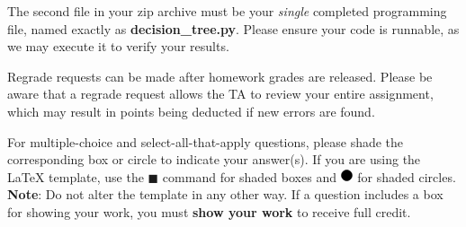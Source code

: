 \documentclass{article}
\newcommand{\blackcircle}{\tikz\draw[black,fill=black] (0,0) circle (1ex);}
\begin{document}
\begin{itemize}
\begin{itemize}
The second file in your zip archive must be your \emph{single} completed programming file, named exactly as \textbf{decision\_tree.py}. Please ensure your code is runnable, as we may execute it to verify your results.

Regrade requests can be made after homework grades are released. Please be aware that a regrade request allows the TA to review your entire assignment, which may result in points being deducted if new errors are found.

\end{itemize}

\end{itemize}

For multiple-choice and select-all-that-apply questions, please shade the corresponding box or circle to indicate your answer(s). If you are using the LaTeX template, use the $\blacksquare$ command for shaded boxes and $\blackcircle$ for shaded circles. \textbf{Note}: Do not alter the template in any other way. If a question includes a box for showing your work, you must \textbf{show your work} to receive full credit.



\clearpage




\clearpage

\clearpage

\clearpage

\end{document}
